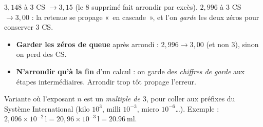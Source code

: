 \documentclass[11pt,a4paper]{article}
\begin{document}
\begin{center}
\end{center}

\begin{exemplebox}
$3,148$ à $3$ CS $\to 3,15$ (le $8$ supprimé fait arrondir par excès). \quad
$2,996$ à $3$ CS $\to 3,00$ : la retenue se propage «~en cascade~», et l'on \emph{garde} les deux zéros
pour conserver $3$ CS.
\end{exemplebox}

\begin{piege}
\begin{itemize}[leftmargin=1.6em,topsep=2pt,itemsep=2pt]
  \item \textbf{Garder les zéros de queue} après arrondi : $2,996\to 3,00$ (et non $3$), sinon on perd des CS.
  \item \textbf{N'arrondir qu'à la fin} d'un calcul : on garde des \emph{chiffres de garde} aux étapes
        intermédiaires. Arrondir trop tôt propage l'erreur.
\end{itemize}
\end{piege}

\begin{remarque}
Variante où l'exposant $n$ est un \emph{multiple de $3$}, pour coller aux préfixes du Système
International (kilo $10^{3}$, milli $10^{-3}$, micro $10^{-6}$\dots). Exemple :
$2,096\times10^{-2}\,\si{\litre}=20,96\times10^{-3}\,\si{\litre}=\qty{20,96}{\milli\litre}$.
\end{remarque}
\end{document}
